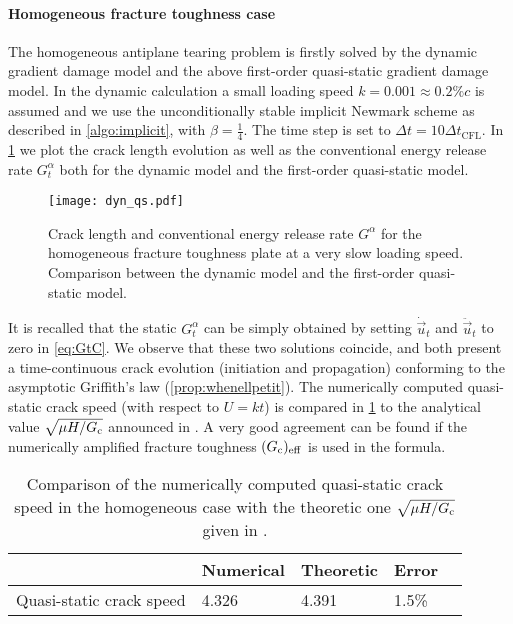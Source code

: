 \paragraph{Homogeneous fracture toughness case} The homogeneous antiplane tearing problem is firstly solved by the dynamic gradient damage model and the above first-order quasi-static gradient damage model. In the dynamic calculation a small loading speed $k=0.001\approx 0.2\%c$ is assumed and we use the unconditionally stable implicit Newmark scheme as described in \cref{algo:implicit}, with $\beta=\frac{1}{4}$. The time step is set to $\Delta t=10\Delta t_\mathrm{CFL}$. In \cref{fig:homoGcqs} we plot the crack length evolution as well as the conventional energy release rate $G^\alpha_t$ both for the dynamic model and the first-order quasi-static model.
\begin{figure}[htbp]
\centering
\texttt{[image: dyn\_qs.pdf]}
\caption{Crack length and conventional energy release rate $G^\alpha$ for the homogeneous fracture toughness plate at a very slow loading speed. Comparison between the dynamic model and the first-order quasi-static model.} \label{fig:homoGcqs}
\end{figure}
It is recalled that the static $G^\alpha_t$ can be simply obtained by setting $\dot{\vec{u}}_t$ and $\ddot{\vec{u}}_t$ to zero in \eqref{eq:GtC}. We observe that these two solutions coincide, and both present a time-continuous crack evolution (initiation and propagation) conforming to the asymptotic Griffith's law (\cref{prop:whenellpetit}). The numerically computed quasi-static crack speed (with respect to $U=kt$) is compared in \cref{tab:compqsv} to the analytical value $\sqrt{\mu H/G_\mathrm{c}}$ announced in \cite{BourdinFrancfortMarigo:2008}. A very good agreement can be found if the numerically amplified fracture toughness $(G_\mathrm{c})_\mathrm{eff}$ is used in the formula.
\begin{table}[htbp]
\centering
\caption{Comparison of the numerically computed quasi-static crack speed in the homogeneous case with the theoretic one $\sqrt{\mu H/G_\mathrm{c}}$ given in \cite{BourdinFrancfortMarigo:2008}.} \label{tab:compqsv}
\begin{tabular}{lllll} \toprule
& Numerical & Theoretic & Error \\ \midrule
Quasi-static crack speed & 4.326 & 4.391 & 1.5\% \\ \bottomrule
\end{tabular}
\end{table}


